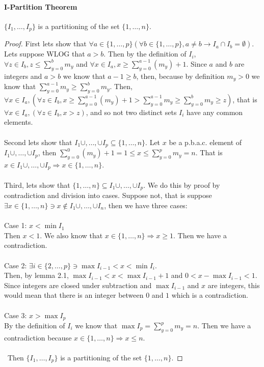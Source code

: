 \documentclass{article}
\begin{document}
\paragraph{I-Partition Theorem}
$\{I_1, \ldots, I_p\}$ is a partitioning of the set $\{1, \ldots, n\}$.
\begin{proof}
First lets show that $\forall a \in \{1, \ldots, p\}(\forall b \in \{1, \ldots, p\}, a \neq b \rightarrow I_a \cap I_b = \emptyset)$. Lets suppose WLOG that $a > b$. Then by the definition of $I_i$, $\forall z \in I_b, z \leq \sum_{y = 0}^bm_y$ and $\forall x \in I_a, x \geq \sum_{y = 0}^{a - 1}(m_y) + 1$. Since $a$ and $b$ are integers and $a > b$ we know that $a - 1 \geq b$, then, because by definition $m_y > 0$ we know that $\sum_{y = 0}^{a - 1}m_y \geq \sum_{y = 0}^bm_y$. Then, $\forall x \in I_a, (\forall z \in I_b, x \geq \sum_{y = 0}^{a - 1}(m_y) + 1 > \sum_{y = 0}^{a - 1}m_y \geq \sum_{y = 0}^bm_y \geq z)$, that is $\forall x \in I_a, (\forall z \in I_b, x > z)$, and so not two distinct sets $I_i$ have any common elements.\\\\
Second lets show that $I_1 \cup, \ldots, \cup I_p \subseteq \{1, \ldots, n\}$. Let $x$ be a p.b.a.c. element of $I_1 \cup, \ldots, \cup I_p$, then $\sum_{y = 0}^0(m_y) + 1 = 1 \leq x \leq \sum_{y = 0}^pm_y = n$. That is $x \in I_1 \cup, \ldots, \cup I_p \Rightarrow x \in \{1, \ldots, n\}$.\\\\
Third, lets show that $\{1, \ldots, n\} \subseteq I_1 \cup, \ldots, \cup I_p$. We do this by proof by contradiction and division into cases. Suppose not, that is suppose $\exists x \in \{1, \ldots, n\} \ni x \notin I_1 \cup, \ldots, \cup I_n$, then we have three cases:\\\\
Case 1: $x < \min{I_1}$\\
Then $x < 1$. We also know that $x \in \{1, \ldots, n\} \Rightarrow x \geq 1$. Then we have a contradiction.\\\\
Case 2: $\exists i \in \{2, \ldots, p\} \ni \max{I_{i - 1}} < x < \min{I_i}$.\\
Then, by lemma 2.1, $\max{I_{i - 1}} < x < \max{I_{i - 1}} + 1$ and $0 < x - \max{I_{i - 1}} < 1$. Since integers are closed under subtraction and $\max{I_{i - 1}}$ and $x$ are integers, this would mean that there is an integer between $0$ and $1$ which is a contradiction.\\\\
Case 3: $x > \max{I_p}$\\
By the definition of $I_i$ we know that $\max{I_p} = \sum_{y = 0}^{p}m_y = n$. Then we have a contradiction because $x \in \{1, \ldots, n\} \Rightarrow x \leq n$.\\\\\
Then $\{I_1, \ldots, I_p\}$ is a partitioning of the set $\{1, \ldots, n\}$.
\end{proof}
\end{document}
